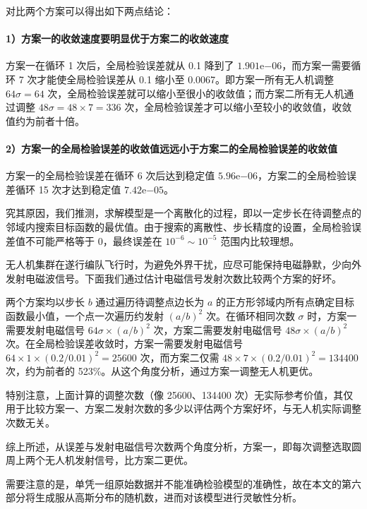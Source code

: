 \documentclass[withoutpreface,bwprint]{cumcmthesis} %
\begin{document}
对比两个方案可以得出如下两点结论：

\paragraph{1）方案一的收敛速度要明显优于方案二的收敛速度}
方案一在循环 1 次后，全局检验误差就从 0.1 降到了 $1.901\mathrm{e}{-06}$，而方案一需要循环 7 次才能使全局检验误差从 0.1 缩小至 0.0067。即方案一所有无人机调整 $64\sigma = 64$ 次，全局检验误差就可以缩小至很小的收敛值；而方案二所有无人机通过调整 $48\sigma = 48 \times 7 = 336$ 次，全局检验误差才可以缩小至较小的收敛值，收敛值约为前者十倍。

\paragraph{2）方案一的全局检验误差的收敛值远远小于方案二的全局检验误差的收敛值}
方案一的全局检验误差在循环 6 次后达到稳定值 $5.96\mathrm{e}{-06}$，方案二的全局检验误差循环 15 次才达到稳定值 $7.42\mathrm{e}{-05}$。

究其原因，我们推测，求解模型是一个离散化的过程，即以一定步长在待调整点的邻域内搜索目标函数的最优值。由于搜索的离散性、步长精度的设置，全局检验误差值不可能严格等于 0，最终误差在 $10^{-6} \sim 10^{-5}$ 范围内比较理想。

无人机集群在遂行编队飞行时，为避免外界干扰，应尽可能保持电磁静默，少向外发射电磁波信号。下面我们通过估计电磁信号发射次数比较两个方案的好坏。

两个方案均以步长 $b$ 通过遍历待调整点边长为 $a$ 的正方形邻域内所有点确定目标函数最小值，一个点一次遍历约发射 \( (a/b)^2 \) 次。在循环相同次数 $\sigma$ 时，方案一需要发射电磁信号 $64\sigma \times (a/b)^2$ 次，方案二需要发射电磁信号 $48\sigma \times (a/b)^2$ 次。在全局检验误差收敛时，方案一需要发射电磁信号 $64 \times 1 \times (0.2/0.01)^2 = 25600$ 次，而方案二仅需 $48 \times 7 \times (0.2/0.01)^2 = 134400$ 次，约为前者的 523\%。从这个角度分析，通过方案一调整无人机更优。

特别注意，上面计算的调整次数（像 25600、134400 次）无实际参考价值，其仅用于比较方案一、方案二发射次数的多少以评估两个方案好坏，与无人机实际调整次数无关。

综上所述，从误差与发射电磁信号次数两个角度分析，方案一，即每次调整选取圆周上两个无人机发射信号，比方案二更优。

需要注意的是，单凭一组原始数据并不能准确检验模型的准确性，故在本文的第六部分将生成服从高斯分布的随机数，进而对该模型进行灵敏性分析。
\end{document}

